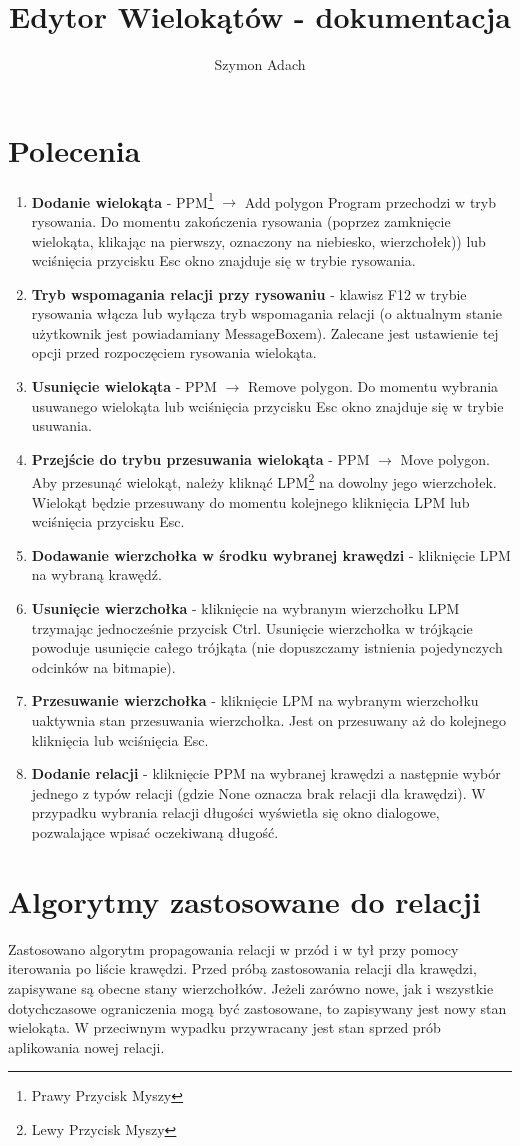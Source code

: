 \documentclass[]{article}
\title{Edytor Wielokątów - dokumentacja}
\author{Szymon Adach}
\begin{document}
\maketitle

\section{Polecenia}
\begin{enumerate}
	\item \textbf{Dodanie wielokąta} - PPM\footnote{Prawy Przycisk Myszy} $\rightarrow$ Add polygon \newline
	Program przechodzi w tryb rysowania. Do momentu zakończenia rysowania (poprzez zamknięcie wielokąta, klikając na pierwszy, oznaczony na niebiesko, wierzchołek)) lub wciśnięcia przycisku Esc okno znajduje się w trybie rysowania.
	\item \textbf{Tryb wspomagania relacji przy rysowaniu} - klawisz F12 w trybie rysowania włącza lub wyłącza tryb wspomagania relacji (o aktualnym stanie użytkownik jest powiadamiany MessageBoxem). Zalecane jest ustawienie tej opcji przed rozpoczęciem rysowania wielokąta.
	\item \textbf{Usunięcie wielokąta} - PPM $\rightarrow$ Remove polygon.
	Do momentu wybrania usuwanego wielokąta lub wciśnięcia przycisku Esc okno znajduje się w trybie usuwania.
	\item \textbf{Przejście do trybu przesuwania wielokąta} - PPM $\rightarrow$ Move polygon. \newline
	Aby przesunąć wielokąt, należy kliknąć LPM\footnote{Lewy Przycisk Myszy} na dowolny jego wierzchołek. Wielokąt będzie przesuwany do momentu kolejnego kliknięcia LPM lub wciśnięcia przycisku Esc.
	\item \textbf{Dodawanie wierzchołka w środku wybranej krawędzi} - kliknięcie LPM na wybraną krawędź.
	\item \textbf{Usunięcie wierzchołka} - kliknięcie na wybranym wierzchołku LPM trzymając jednocześnie przycisk Ctrl. Usunięcie wierzchołka w trójkącie powoduje usunięcie całego trójkąta (nie dopuszczamy istnienia pojedynczych odcinków na bitmapie).
	\item \textbf{Przesuwanie wierzchołka} - kliknięcie LPM na wybranym wierzchołku uaktywnia stan przesuwania wierzchołka. Jest on przesuwany aż do kolejnego kliknięcia lub wciśnięcia Esc.
	\item \textbf{Dodanie relacji} - kliknięcie PPM na wybranej krawędzi a następnie wybór jednego z typów relacji (gdzie None oznacza brak relacji dla krawędzi). W przypadku wybrania relacji długości wyświetla się okno dialogowe, pozwalające wpisać oczekiwaną długość.
\end{enumerate}
\section{Algorytmy zastosowane do relacji}
Zastosowano algorytm propagowania relacji w przód i w tył przy pomocy iterowania po liście krawędzi. Przed próbą zastosowania relacji dla krawędzi, zapisywane są obecne stany wierzchołków. Jeżeli zarówno nowe, jak i wszystkie dotychczasowe ograniczenia mogą być zastosowane, to zapisywany jest nowy stan wielokąta. W przeciwnym wypadku przywracany jest stan sprzed prób aplikowania nowej relacji.
\end{document}
